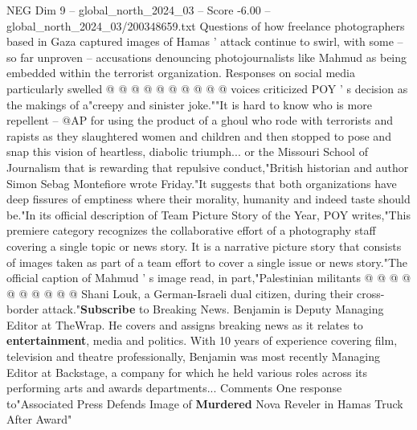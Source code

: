 \begin{textsample}{NEG Dim 9 – global\_north\_2024\_03 – Score -6.00 – global\_north\_2024\_03/200348659.txt}
Questions of how freelance photographers based in Gaza captured images of Hamas ' attack continue to swirl, with some -- so far unproven -- accusations denouncing photojournalists like Mahmud as being embedded within the terrorist organization.
Responses on social media particularly swelled @ @ @ @ @ @ @ @ @ @ voices criticized POY ' s decision as the makings of a"creepy and sinister joke.""It is hard to know who is more repellent -- @AP for using the product of a ghoul who rode with terrorists and rapists as they slaughtered women and children and then stopped to pose and snap this vision of heartless, diabolic triumph... or the Missouri School of Journalism that is rewarding that repulsive conduct,"British historian and author Simon Sebag Montefiore wrote Friday."It suggests that both organizations have deep fissures of emptiness where their morality, humanity and indeed taste should be."In its official description of Team Picture Story of the Year, POY writes,"This premiere category recognizes the collaborative effort of a photography staff covering a single topic or news story.
It is a narrative picture story that consists of images taken as part of a team effort to cover a single issue or news story."The official caption of Mahmud ' s image read, in part,"Palestinian militants @ @ @ @ @ @ @ @ @ @ Shani Louk, a German-Israeli dual citizen, during their cross-border attack."\textbf{Subscribe} to Breaking News.
Benjamin is Deputy Managing Editor at TheWrap.
He covers and assigns breaking news as it relates to \textbf{entertainment}, media and politics.
With 10 years of experience covering film, television and theatre professionally, Benjamin was most recently Managing Editor at Backstage, a company for which he held various roles across its performing arts and awards departments...
Comments One response to"Associated Press Defends Image of \textbf{Murdered} Nova Reveler in Hamas Truck After Award"

\end{textsample}
